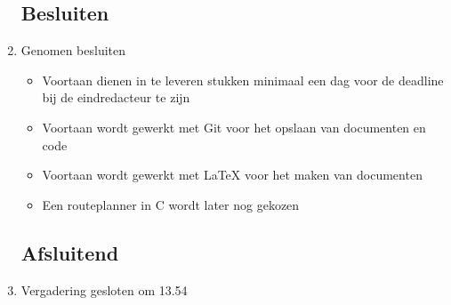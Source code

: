 \documentclass{article}
\begin{document}
\begin{enumerate}
	\subsection*{Besluiten}
	\item Genomen besluiten
	\begin{itemize}
		\item Voortaan dienen in te leveren stukken minimaal een dag voor de deadline bij de eindredacteur te zijn
		\item Voortaan wordt gewerkt met Git voor het opslaan van documenten en code
		\item Voortaan wordt gewerkt met LaTeX voor het maken van documenten
		\item Een routeplanner in C wordt later nog gekozen
	\end{itemize}

	\noindent 
	\subsection*{Afsluitend}
	\item Vergadering gesloten om 13.54

\end{enumerate}
\end{document}

